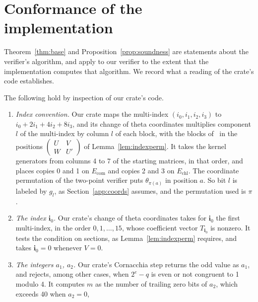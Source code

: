 \documentclass[version=preprint]{iacrcc}
\newcommand{\Ecom}{E_{\mathrm{com}}}
\newcommand{\Echl}{E_{\mathrm{chl}}}
\begin{document}
    \section{Conformance of the implementation}
    \label{app:remains}

    Theorem~\ref{thm:base} and Proposition~\ref{prop:soundness} are statements
    about the verifier's algorithm, and apply to our verifier to the extent that
    the implementation computes that algorithm. We record what a reading of the crate's code establishes.

    \begin{remark}[Conformance]
        \label{rem:conformance}
        The following hold by inspection of our crate's code.
        \begin{enumerate}[label=(\alph*)]
            \item \emph{Index convention.} Our crate maps the multi-index $(i_0,
            i_1, i_2, i_3)$ to $i_0 + 2i_1 + 4i_2 + 8i_3$, and its change of theta
            coordinates multiplies component $l$ of the multi-index by column $l$
            of each block, with the blocks of~\cite[Theorem 12]{Dar24} in the
            positions $\left(\begin{smallmatrix} U & V \\ W & U'
            \end{smallmatrix}\right)$ of Lemma~\ref{lem:indexperm}. It takes the
            kernel generators from columns 4 to 7 of the starting matrices, in
            that order, and places copies 0 and 1 on $\Ecom$ and copies 2 and 3 on
            $\Echl$. The coordinate permutation of the two-point verifier puts
            $\theta_{\pi(a)}$ in position $a$. So bit $l$ is labeled by $g_l$, as
            Section~\ref{app:coords} assumes, and the permutation used is $\pi$.
            \item \emph{The index $\mathbf i_0$.} Our crate's change of theta
            coordinates takes for $\mathbf i_0$ the first multi-index, in the order
            $0, 1, \ldots, 15$, whose coefficient vector $T_{\mathbf i_0}$ is
            nonzero. It tests the condition on sections, as
            Lemma~\ref{lem:indexperm} requires, and takes $\mathbf i_0 = 0$ whenever
            $V = 0$.
            \item \emph{The integers $a_1$, $a_2$.} Our crate's Cornacchia step
            returns the odd value as $a_1$, and rejects, among other cases, when
            $2^e - q$ is even or not congruent to 1 modulo 4. It computes $m$ as
            the number of trailing zero bits of $a_2$, which exceeds 40 when $a_2 = 0$,

\end{enumerate}
\end{remark}
\end{document}
